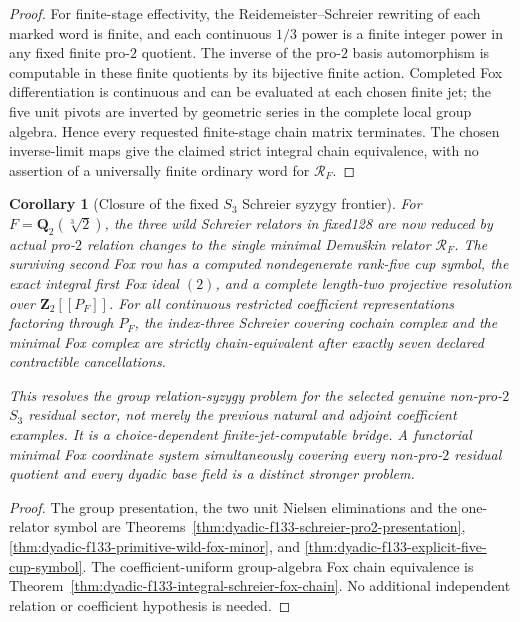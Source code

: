 \documentclass[11pt]{article}
\newtheorem{corollary}[theorem]{Corollary}
\theoremstyle{definition}
\begin{document}
\begin{proof}
For finite-stage
effectivity,
the Reidemeister--Schreier
rewriting of each
marked word
is finite, and
each continuous
$1/3$ power
is a finite
integer power
in any fixed
finite pro-$2$
quotient.
The inverse
of the pro-$2$
basis automorphism
is computable
in these finite
quotients by
its bijective
finite action.
Completed Fox
differentiation
is continuous
and can be
evaluated at
each chosen
finite jet;
the five
unit pivots
are inverted
by geometric
series in
the complete
local group
algebra.
Hence every
requested
finite-stage
chain matrix
terminates.
The chosen
inverse-limit
maps give the
claimed
strict integral
chain equivalence,
with no assertion
of a universally
finite ordinary
word for
$\mathscr R_F$.
\end{proof}

\begin{corollary}[Closure of the fixed $S_3$ Schreier syzygy frontier]
\label{cor:dyadic-f133-fixed-s3-syzygy-closure}
For
$F=\mathbf Q_2(\sqrt[3]2)$,
the three wild
Schreier relators
in fixed128
are now reduced
by \emph{actual}
pro-$2$ relation
changes to the
single minimal
Demu\v{s}kin relator
$\mathscr R_F$.
The surviving
second Fox row
has a computed
nondegenerate
rank-five
cup symbol,
the exact
integral first
Fox ideal $(2)$,
and a complete
length-two
projective
resolution over
$\mathbf Z_2[[P_F]]$.
For all
continuous
restricted
coefficient
representations
factoring through
$P_F$, the
index-three
Schreier
covering
cochain complex
and the
minimal Fox
complex are
strictly
chain-equivalent
after exactly
seven declared
contractible
cancellations.

This resolves
the \emph{group
relation-syzygy}
problem for the
selected genuine
non-pro-$2$
$S_3$ residual
sector, not
merely the
previous natural
and adjoint
coefficient
examples.
It is a
\emph{choice-dependent}
finite-jet-computable
bridge.
A functorial
minimal Fox
coordinate
system
simultaneously
covering every
non-pro-$2$
residual
quotient and
every dyadic
base field
is a distinct
stronger problem.
\end{corollary}

\begin{proof}
The group
presentation,
the two unit
Nielsen eliminations
and the
one-relator
symbol are
Theorems~\ref{thm:dyadic-f133-schreier-pro2-presentation},
\ref{thm:dyadic-f133-primitive-wild-fox-minor},
and
\ref{thm:dyadic-f133-explicit-five-cup-symbol}.
The coefficient-uniform
group-algebra
Fox chain
equivalence is
Theorem~\ref{thm:dyadic-f133-integral-schreier-fox-chain}.
No additional
independent
relation or
coefficient
hypothesis is
needed.
\end{proof}
\end{document}
